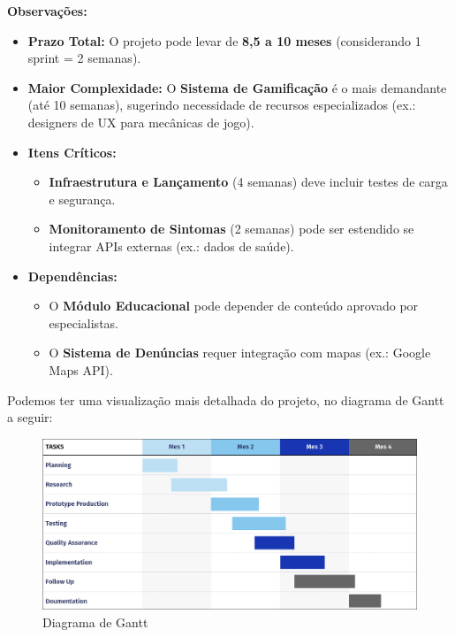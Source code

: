 \documentclass[a5paper, 12pt]{article}
\begin{document}
\noindent \textbf{Observações:}
\begin{itemize}
    \item \textbf{Prazo Total:} O projeto pode levar de \textbf{8,5 a 10 meses} (considerando 1 sprint = 2 semanas).
    \item \textbf{Maior Complexidade:} O \textbf{Sistema de Gamificação} é o mais demandante (até 10 semanas), sugerindo necessidade de recursos especializados (ex.: designers de UX para mecânicas de jogo).
    \item \textbf{Itens Críticos:} 
    \begin{itemize}
        \item \textbf{Infraestrutura e Lançamento} (4 semanas) deve incluir testes de carga e segurança.
        \item \textbf{Monitoramento de Sintomas} (2 semanas) pode ser estendido se integrar APIs externas (ex.: dados de saúde).
    \end{itemize}
    \item \textbf{Dependências:} 
    \begin{itemize}
        \item O \textbf{Módulo Educacional} pode depender de conteúdo aprovado por especialistas.
        \item O \textbf{Sistema de Denúncias} requer integração com mapas (ex.: Google Maps API).
    \end{itemize}
\end{itemize}

Podemos ter uma visualização mais detalhada do projeto, no diagrama de Gantt a seguir:

\begin{figure}[h]
    \centering
    \includegraphics[width=\textwidth,keepaspectratio]{2025-04-18_16-03-51_screenshot.png}
    \caption{Diagrama de Gantt}
    \label{fig:enter-label}
\end{figure}
\end{document}
